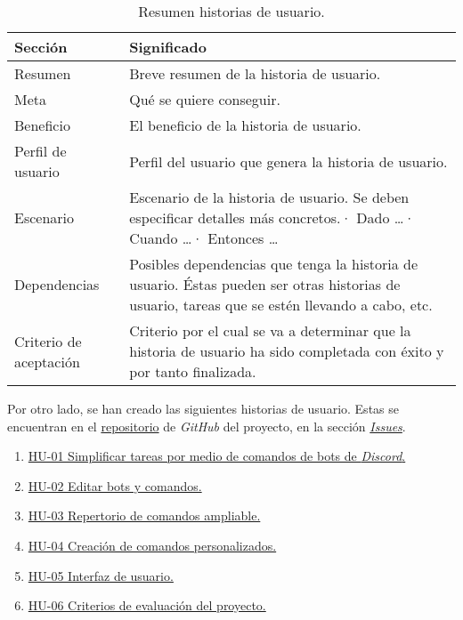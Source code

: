 \begin{table}[H]
    \centering
    \def\arraystretch{1.25}
    \begin{adjustbox}{max width=\textwidth}
    \begin{tabularx}{\textwidth}{|l|L|}
    \hline
        \textbf{Sección} & \textbf{Significado} \\ \hline
    \hline
        Resumen & Breve resumen de la historia de usuario. \\ \hline
        Meta & Qué se quiere conseguir. \\ \hline
        Beneficio & El beneficio de la historia de usuario. \\ \hline
        Perfil de usuario & Perfil del usuario que genera la historia de usuario. \\ \hline
        Escenario & Escenario de la historia de usuario. Se deben especificar detalles más concretos.\linebreak · Dado …\linebreak · Cuando …\linebreak · Entonces … \\ \hline
        Dependencias & Posibles dependencias que tenga la historia de usuario. Éstas pueden ser otras historias de usuario, tareas que se estén llevando a cabo, etc. \\ \hline
        Criterio de aceptación & Criterio por el cual se va a determinar que la historia de usuario ha sido completada con éxito y por tanto finalizada. \\ \hline
    \end{tabularx}
    \end{adjustbox}
    \caption{Resumen historias de usuario.}
\end{table}

\bigskip

Por otro lado, se han creado las siguientes historias de usuario. Estas se encuentran en el \href{https://github.com/harvestcore/matroos}{repositorio} de \textit{GitHub} del proyecto, en la sección \href{https://github.com/harvestcore/matroos/issues}{\textit{Issues}}.

\begin{enumerate}
	\item \href{https://github.com/harvestcore/matroos/issues/1}{HU-01 Simplificar tareas por medio de comandos de bots de \textit{Discord}.}
	\item \href{https://github.com/harvestcore/matroos/issues/3}{HU-02 Editar bots y comandos.}
	\item \href{https://github.com/harvestcore/matroos/issues/5}{HU-03 Repertorio de comandos ampliable.}
	\item \href{https://github.com/harvestcore/matroos/issues/7}{HU-04 Creación de comandos personalizados.}
	\item \href{https://github.com/harvestcore/matroos/issues/25}{HU-05 Interfaz de usuario.}
	\item \href{https://github.com/harvestcore/matroos/issues/39}{HU-06 Criterios de evaluación del proyecto.}
\end{enumerate}


